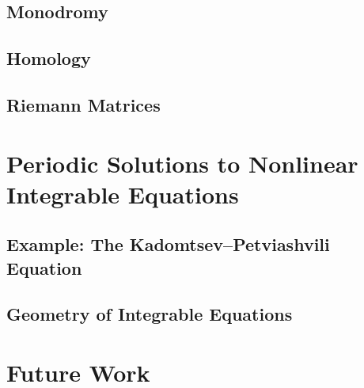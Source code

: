 \documentclass{amsart}
\begin{document}
\subsection{Monodromy}

\subsection{Homology}

\subsection{Riemann Matrices}

\section{Periodic Solutions to Nonlinear Integrable Equations}

\subsection{Example: The Kadomtsev--Petviashvili Equation}

\subsection{Geometry of Integrable Equations}


\section{Future Work}
\end{document}
